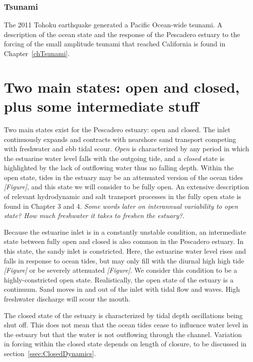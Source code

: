 {\subsubsection{Tsunami}
The 2011 Tohoku earthquake generated a Pacific Ocean-wide tsunami. A description of the ocean state and the response of the Pescadero estuary to the forcing of the small amplitude tsunami that reached California is found in Chapter~\ref{chTsunami}.



\section{Two main states: open and closed, plus some intermediate stuff}
\label{betterlabelmaybe}

Two main states exist for the Pescadero estuary: open and closed.  The inlet continuously expands and contracts with nearshore sand transport competing with freshwater and ebb tidal scour. \emph{Open} is characterized by any period in which the estuarine water level falls with the outgoing tide, and a \emph{closed} state is highlighted by the lack of outflowing water thus no falling depth. Within the open state, tides in the estuary may be an attenuated version of the ocean tides \emph{[Figure]}, and this state we will consider to be fully open. An extensive description of relevant hydrodynamic and salt transport processes in the fully open state is found in Chapter 3 and 4. \emph{Some words later on interannual variability to open state? How much freshwater it takes to freshen the estuary?}.



Because the estuarine inlet is in a constantly unstable condition, an intermediate state between fully open and closed is also common in the Pescadero estuary.  In this state, the sandy inlet is constricted. Here, the estuarine water level rises and falls in response to ocean tides, but may only fill with the diurnal high high tide \emph{[Figure]} or be severely attenuated \emph{[Figure]}. We consider this condition to be a highly-constricted open state. Realistically, the open state of the estuary is a continuum. Sand moves in and out of the inlet with tidal flow and waves. High freshwater discharge will scour the mouth.

The closed state of the estuary is characterized by tidal depth oscillations being shut off. This does not mean that the ocean tides cease to influence water level in the estuary but that the water is not outflowing through the channel. Variation in forcing within the closed
state depends on length of closure, to be discussed in section~\ref{ssec:ClosedDynamics}.

}
